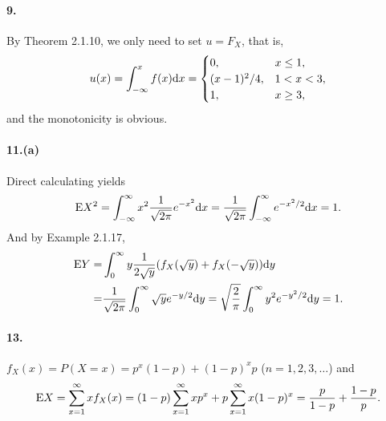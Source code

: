 
\paragraph{9.}
\begin{solution}
  By Theorem 2.1.10, we only need to set $u=F_X$, that is,
  \[
    u(x) = \int_{-\infty}^x f(x)\mathrm{d} x = 
    \begin{cases}
      0, & x\le 1, \\
      (x-1)^2/4, & 1<x<3, \\
      1, & x\ge 3,
    \end{cases}
  \]
  and the monotonicity is obvious.
\end{solution}

\paragraph{11.(a)}
\begin{solution}
  Direct calculating yields
  \[\begin{split}
    \mathrm{E} X^2 = \int_{-\infty}^\infty x^2 \frac{1}{\sqrt{2\pi}}e^{-x^2}\mathrm{d} x
    = \frac{1}{\sqrt{2\pi}}\int_{-\infty}^\infty e^{-x^2/2}\mathrm{d} x
    = 1.
  \end{split}\]
  And by Example 2.1.17,
  \[\begin{split}
     \mathrm{E} Y
    =& \int_0^\infty y\frac{1}{2\sqrt{y}}
      (f_X(\sqrt{y})+f_X(-\sqrt{y}))\mathrm{d} y \\
    =& \frac{1}{\sqrt{2\pi}}\int_0^\infty\sqrt{y}e^{-y/2}\mathrm{d} y
    = \sqrt{\frac{2}{\pi}}\int_0^\infty y^2e^{-y^2/2}\mathrm{d} y = 1.
  \end{split}\]
\end{solution}

\paragraph{13.}
\begin{solution}
  $f_X(x) = P(X=x) = p^x(1-p) + (1-p)^xp$ ($n=1,2,3,\dots$) and
  \[\begin{split}
    \mathrm{E} X = \sum_{x=1}^\infty xf_X(x)
    = (1-p)\sum_{x=1}^\infty xp^x + p\sum_{x=1}^\infty x(1-p)^x 
    = \frac{p}{1-p}+\frac{1-p}{p}.
  \end{split}\]
\end{solution}

